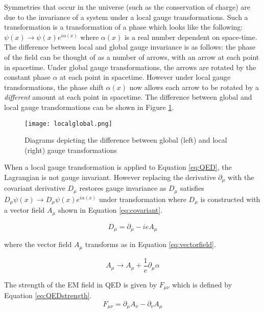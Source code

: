\documentclass[11pt,oneside,a4paper]{article}
\begin{document}
Symmetries that occur in the universe (such as the conservation of charge) are due to the invariance of a system under a local gauge transformations. Such a transformation is a transformation of a phase which looks like the following: $\psi(x) \rightarrow \psi(x)e^{i\alpha(x)}$ where $\alpha(x)$ is a real number dependent on space-time. The difference between local and global gauge invariance is as follows: the phase of the field can be thought of as a number of arrows, with an arrow at each point in spacetime. Under global gauge transformations, the arrows are rotated by the constant phase $\alpha$ at each point in spacetime. However under local gauge transformations, the phase shift $\alpha(x)$ now allows each arrow to be rotated by a \textit{different} amount at each point in spacetime. The difference between global and local gauge transformations can be shown in Figure \ref{fig:localglobal}.

\begin{figure}[htbp]
	\centering
	\texttt{[image: localglobal.png]}
	\caption{Diagrams depicting the difference between global (left) and local (right) gauge transformations}
	\label{fig:localglobal}
\end{figure}

When a local gauge transformation is applied to Equation \ref{eq:QED}, the Lagrangian is not gauge invariant. However replacing the derivative $\partial_{\mu}$ with the covariant derivative $D_{\mu}$ restores gauge invariance as $D_{\mu}$ satisfies $D_{\mu}\psi(x)\rightarrow D_{\mu}\psi(x)e^{i\alpha(x)}$ under transformation where $D_{\mu}$ is constructed with a vector field $A_{\mu}$ shown in Equation \ref{eq:covariant}.

\begin{equation}
\label{eq:covariant}
D_{\mu} = \partial_{\mu} - ieA_{\mu}
\end{equation}
 
where the vector field $A_{\mu}$ transforms as in Equation \ref{eq:vectorfield}.

\begin{equation}
\label{eq:vectorfield}
A_{\mu} \rightarrow A_{\mu} + \frac{1}{e}\partial_{\mu}\alpha
\end{equation}

The strength of the EM field in QED is given by $F_{\mu\nu}$ which is defined by Equation \ref{eq:QEDstrength}.
\begin{equation}
\label{eq:QEDstrength}
F_{\mu\nu} = \partial_{\mu}A_{\nu} - \partial_{\nu}A_{\mu}
\end{equation}
\end{document}
